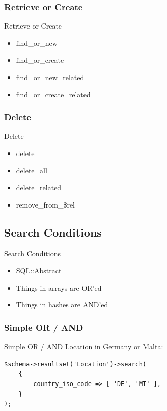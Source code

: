 \subsubsection{Retrieve or Create}

\begin{frame}{Retrieve or Create}
\begin{itemize}
\item find\_or\_new
\item find\_or\_create
\item find\_or\_new\_related 
\item find\_or\_create\_related
\end{itemize}
\end{frame}

\subsubsection{Delete}

\begin{frame}{Delete}
\begin{itemize}
\item delete
\item delete\_all
\item delete\_related
\item remove\_from\_\$rel
\end{itemize}
\end{frame}

\subsection{Search Conditions}

\begin{frame}{Search Conditions}
\begin{itemize}
\item SQL::Abstract
\item Things in arrays are OR'ed
\item Things in hashes are AND'ed
\end{itemize}
\end{frame}

\subsubsection{Simple OR / AND}
\begin{frame}[fragile]{Simple OR / AND}
Location in Germany or Malta:
\begin{lstlisting}
$schema->resultset('Location')->search(
    {
        country_iso_code => [ 'DE', 'MT' ],
    }
);
\end{lstlisting}
\end{frame}

